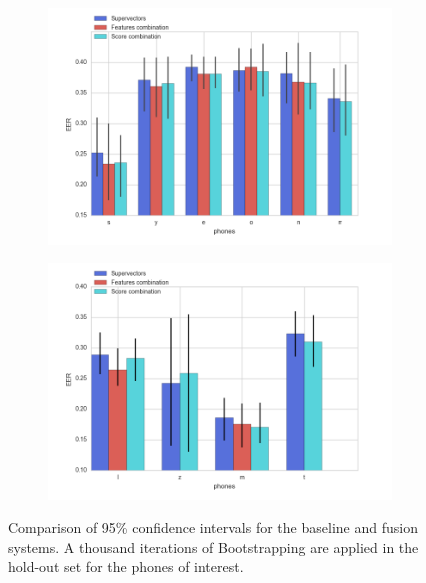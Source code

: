 \begin{figure}[H]
  \centering
  \begin{subfigure}{.47\textwidth}
    \centering
    \captionsetup{width=.95\linewidth}
    \includegraphics[width=1.08\linewidth, height=0.225\textheight]{files/figures/results/bootstrapping/bootstrapping_heldout_2}
    \caption{}
    \label{fig:bootstrappingHoldOutA}
  \end{subfigure}
  \begin{subfigure}{.47\textwidth}
    \centering
    \captionsetup{width=.95\linewidth}
    \includegraphics[width=.72\linewidth, height=0.225\textheight]{files/figures/results/bootstrapping/bootstrapping_heldout_1}
    \caption{}
    \label{fig:bootstrappingHoldOutB}
  \end{subfigure}
  \caption{Comparison of 95\% confidence intervals for the baseline and fusion systems.
  A thousand iterations of Bootstrapping are applied
  in the hold-out set for the phones of interest.}
  \label{fig:bootstrappingHoldOut}
\end{figure}




